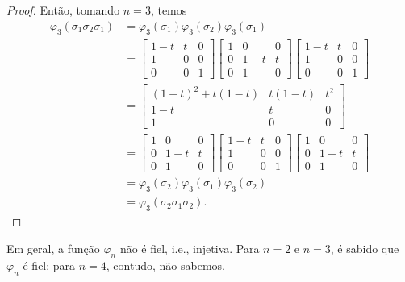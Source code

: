 \begin{proof}
		\par\vspace{0.3cm} Então, tomando $n = 3$, temos
		\begin{align*}
    		\varphi_3(\sigma_1\sigma_2\sigma_1) &= \varphi_3(\sigma_1)\varphi_3(\sigma_2)\varphi_3(\sigma_1) \\ 
    		&= 
    		\begin{bmatrix}
    		1-t & t & 0 \\
    		1 & 0 & 0 \\
    		0 & 0 & 1
    		\end{bmatrix}\begin{bmatrix}
    		1 & 0 & 0 \\
    		0 & 1-t & t \\
    		0 & 1 & 0
    		\end{bmatrix}\begin{bmatrix}
    		1-t & t & 0 \\
    		1 & 0 & 0 \\
    		0 & 0 & 1
    		\end{bmatrix} \\
    		&= \begin{bmatrix}
    		(1-t)^2 +t(1-t) & t(1-t) & t^2 \\
    		1-t & t & 0 \\
    		1 & 0 & 0
    		\end{bmatrix} \\
    		&= \begin{bmatrix}
    		1 & 0 & 0 \\
    		0 & 1-t & t \\
    		0 & 1 & 0
    		\end{bmatrix}\begin{bmatrix}
    		1-t & t & 0 \\
    		1 & 0 & 0 \\
    		0 & 0 & 1
    		\end{bmatrix}\begin{bmatrix}
    		1 & 0 & 0 \\
    		0 & 1-t & t \\
    		0 & 1 & 0
    		\end{bmatrix}\\
    		&= \varphi_3(\sigma_2)\varphi_3(\sigma_1)\varphi_3(\sigma_2)\\
    		&=\varphi_3(\sigma_2\sigma_1\sigma_2).
		\end{align*}
	\end{proof}
	\begin{remark}
		Em geral, a função $\varphi_n$ não é fiel, i.e., injetiva. Para $n=2$ e $n=3$, 
		é sabido que $\varphi_n$ é fiel; para $n=4$, contudo, não sabemos.
	\end{remark}
